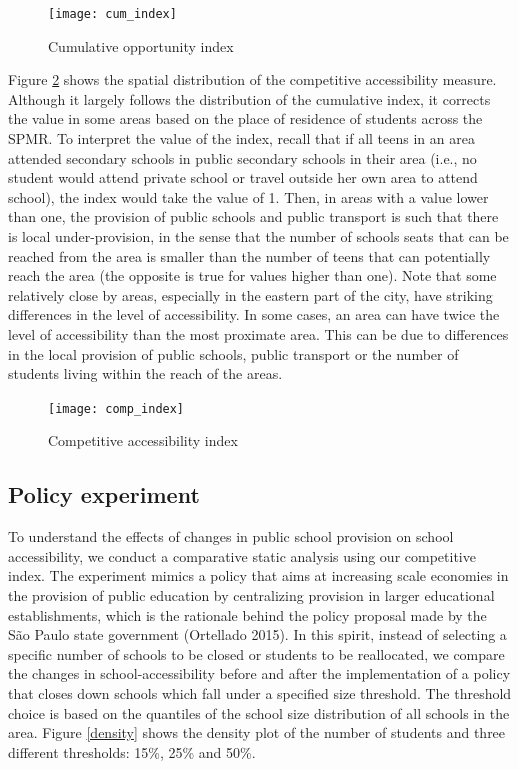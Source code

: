 \documentclass[3p,authoryear,preprint,review,12pt]{elsarticle}
\begin{document}
\begin{figure}[H]
\texttt{[image: cum\_index]} \caption{Cumulative opportunity index}\label{fig:cum_ind}
\end{figure}

Figure \ref{fig:comp_ind} shows the spatial distribution of the competitive accessibility measure. Although it largely follows the distribution of the cumulative index, it corrects the value in some areas based on the place of residence of students across the SPMR. To interpret the value of the index, recall that if all teens in an area attended secondary schools in public secondary schools in their area (i.e., no student would attend private school or travel outside her own area to attend school), the index would take the value of 1. Then, in areas with a value lower than one, the provision of public schools and public transport is such that there is local under-provision, in the sense that the number of schools seats that can be reached from the area is smaller than the number of teens that can potentially reach the area (the opposite is true for values higher than one). Note that some relatively close by areas, especially in the eastern part of the city, have striking differences in the level of accessibility. In some cases, an area can have twice the level of accessibility than the most proximate area. This can be due to differences in the local provision of public schools, public transport or the number of students living within the reach of the areas.

\begin{figure}[H]
\texttt{[image: comp\_index]} \caption{Competitive accessibility index}\label{fig:comp_ind}
\end{figure}

\subsection{Policy experiment}\label{results}

To understand the effects of changes in public school provision on
school accessibility, we conduct a comparative static analysis using our competitive index. The experiment mimics a policy that aims at increasing scale economies in the provision of public education by centralizing provision in larger educational establishments, which is the rationale behind the policy proposal made by the São Paulo state government (Ortellado 2015). In this spirit, instead of selecting a specific number of schools to be closed or students to be reallocated, we compare the changes in school-accessibility before and after the implementation of a policy that closes down schools which fall under a specified size threshold. The threshold  choice is based on the quantiles of the school size distribution of all schools in the area. Figure \ref{density} shows the density plot of the number of students and three different thresholds: 15\%, 25\% and 50\%. 
\end{document}
